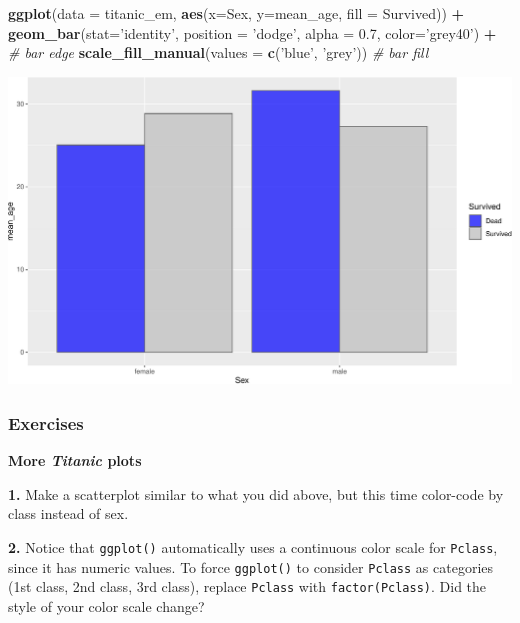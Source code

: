 \documentclass[]{book}
\newenvironment{Shaded}{\begin{snugshade}}{\end{snugshade}}
\newcommand{\CommentTok}[1]{\textcolor[rgb]{0.56,0.35,0.01}{\textit{#1}}}
\newcommand{\DataTypeTok}[1]{\textcolor[rgb]{0.13,0.29,0.53}{#1}}
\newcommand{\FloatTok}[1]{\textcolor[rgb]{0.00,0.00,0.81}{#1}}
\newcommand{\KeywordTok}[1]{\textcolor[rgb]{0.13,0.29,0.53}{\textbf{#1}}}
\newcommand{\NormalTok}[1]{#1}
\newcommand{\OperatorTok}[1]{\textcolor[rgb]{0.81,0.36,0.00}{\textbf{#1}}}
\newcommand{\StringTok}[1]{\textcolor[rgb]{0.31,0.60,0.02}{#1}}
\begin{document}
\begin{Shaded}
\begin{Highlighting}[]
\KeywordTok{ggplot}\NormalTok{(}\DataTypeTok{data =}\NormalTok{ titanic_em, }
       \KeywordTok{aes}\NormalTok{(}\DataTypeTok{x=}\NormalTok{Sex, }\DataTypeTok{y=}\NormalTok{mean_age, }\DataTypeTok{fill =}\NormalTok{ Survived)) }\OperatorTok{+}
\StringTok{  }\KeywordTok{geom_bar}\NormalTok{(}\DataTypeTok{stat=}\StringTok{'identity'}\NormalTok{, }
           \DataTypeTok{position =} \StringTok{'dodge'}\NormalTok{, }
           \DataTypeTok{alpha =} \FloatTok{0.7}\NormalTok{, }
           \DataTypeTok{color=}\StringTok{'grey40'}\NormalTok{) }\OperatorTok{+}\StringTok{ }\CommentTok{# bar edge}
\StringTok{  }\KeywordTok{scale_fill_manual}\NormalTok{(}\DataTypeTok{values =} \KeywordTok{c}\NormalTok{(}\StringTok{'blue'}\NormalTok{, }\StringTok{'grey'}\NormalTok{)) }\CommentTok{# bar fill}
\end{Highlighting}
\end{Shaded}

\includegraphics{figures/unnamed-chunk-262-1.pdf}

\hypertarget{exercises-8}{%
\subsubsection*{Exercises}\label{exercises-8}}

\textbf{More \emph{Titanic} plots}

\textbf{1.} Make a scatterplot similar to what you did above, but this time color-code by class instead of sex.

\textbf{2.} Notice that \texttt{ggplot()} automatically uses a continuous color scale for \texttt{Pclass}, since it has numeric values. To force \texttt{ggplot()} to consider \texttt{Pclass} as categories (1st class, 2nd class, 3rd class), replace \texttt{Pclass} with \texttt{factor(Pclass)}. Did the style of your color scale change?
\end{document}
